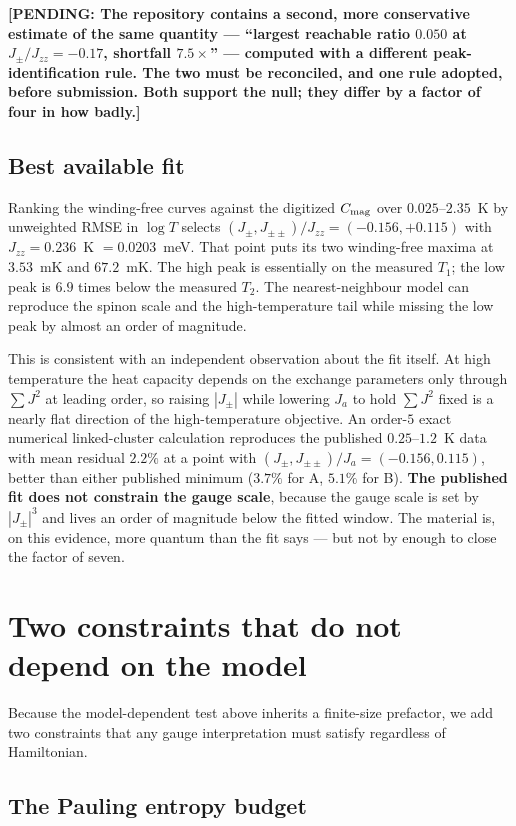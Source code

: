\documentclass[aps,prb,preprint,amsmath,amssymb,superscriptaddress,
longbibliography,floatfix]{revtex4-2}
\newcommand{\Jzz}{J_{zz}}
\newcommand{\Jpm}{J_{\pm}}
\newcommand{\Jpmpm}{J_{\pm\pm}}
\newcommand{\pending}[1]{{\color{red}\textbf{[PENDING: #1]}}}
\begin{document}
\pending{The repository contains a second, more conservative estimate of the
same quantity --- ``largest reachable ratio $0.050$ at $\Jpm/\Jzz=-0.17$,
shortfall $7.5\times$'' --- computed with a different peak-identification rule.
The two must be reconciled, and one rule adopted, before submission.  Both
support the null; they differ by a factor of four in how badly.}

\subsection{Best available fit}

Ranking the winding-free curves against the digitized $C_{\rm mag}$ over
$0.025$--$2.35$~K by unweighted RMSE in $\log T$ selects
$(\Jpm,\Jpmpm)/\Jzz=(-0.156,+0.115)$ with $\Jzz=0.236$~K $=0.0203$~meV.  That
point puts its two winding-free maxima at $3.53$~mK and $67.2$~mK.  The high
peak is essentially on the measured $T_1$; the low peak is $6.9$ times below
the measured $T_2$.  The nearest-neighbour model can reproduce the spinon scale
and the high-temperature tail while missing the low peak by almost an order of
magnitude.

This is consistent with an independent observation about the fit itself.  At
high temperature the heat capacity depends on the exchange parameters only
through $\sum J^2$ at leading order, so raising $|\Jpm|$ while lowering $J_a$ to
hold $\sum J^2$ fixed is a nearly flat direction of the high-temperature
objective.  An order-$5$ exact numerical linked-cluster calculation reproduces
the published $0.25$--$1.2$~K data with mean residual $2.2\%$ at a point with
$(\Jpm,\Jpmpm)/J_a=(-0.156,0.115)$, better than either published minimum
($3.7\%$ for A, $5.1\%$ for B).  \textbf{The published fit does not constrain
the gauge scale}, because the gauge scale is set by $|\Jpm|^3$ and lives an
order of magnitude below the fitted window.  The material is, on this evidence,
more quantum than the fit says --- but not by enough to close the factor of
seven.

\section{Two constraints that do not depend on the model}
\label{sec:entropy}

Because the model-dependent test above inherits a finite-size prefactor, we add
two constraints that any gauge interpretation must satisfy regardless of
Hamiltonian.

\subsection{The Pauling entropy budget}
\end{document}

